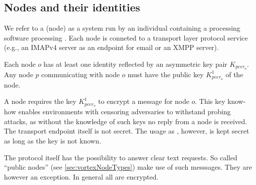 \subsection{Nodes and their identities}
We refer to a \VortexNode (node) as a system run by an individual containing a processing software processing \VortexMessages. Each node is conneted to a transport layer protocol service (e.g., an IMAPv4 server as an endpoint for email or an XMPP server). 

Each node $o$ has at least one identity reflected by an asymmetric key pair $K_{peer_o}$. Any node $p$ communicating with node $o$ must have the public key  $K^1_{peer_o}$ of the node.

A node requires the key $K^1_{peer_o}$ to encrypt a message for node $o$. This key know-how enables environments with censoring adversaries to withstand probing attacks, as without the knowledge of such keys no reply from a node is received. The transport endpoint itself is not secret. The usage as \VortexNode, however, is kept secret as long as the key is not known.

The protocol itself has the possibility to answer clear text requests. So called ``public nodes'' (see \ref{sec:vortexNodeTypes}) make use of such messsages. They are however an exception. In general all \VortexMessages are encrypted.

